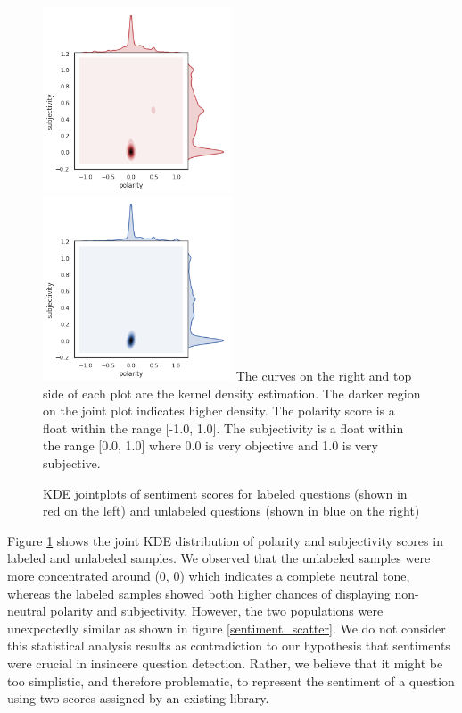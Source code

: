 \documentclass[12pt]{diazessay} %
\begin{document}
{\begin{figure}[!htbp]
    \includegraphics[width=0.5\textwidth]{graphs/labeled_sentiment_jointplot.png}
    \includegraphics[width=0.5\textwidth]{graphs/unlabeled_sentiment_jointplot.png}
    \medskip
    \small
    The curves on the right and top side of each plot are the kernel density estimation. The darker region on the joint plot indicates higher density. The polarity score is a float within the range [-1.0, 1.0]. The subjectivity is a float within the range [0.0, 1.0] where 0.0 is very objective and 1.0 is very subjective.

    \caption{KDE jointplots of sentiment scores for labeled questions (shown in red on the left) and unlabeled questions (shown in blue on the right)}
    \label{figure:sentiment_jointplot}
\end{figure}

Figure \ref{figure:sentiment_jointplot} shows the joint KDE distribution of polarity and subjectivity scores in labeled and unlabeled samples. We observed that the unlabeled samples were more concentrated around (0, 0) which indicates a complete neutral tone, whereas the labeled samples showed both higher chances of displaying non-neutral polarity and subjectivity. However, the two populations were unexpectedly similar as shown in figure \ref{sentiment_scatter}. We do not consider this statistical analysis results as contradiction to our hypothesis that sentiments were crucial in insincere question detection. Rather, we believe that it might be too simplistic, and therefore problematic, to represent the sentiment of a question using two scores assigned by an existing library. 

}
\end{document}
